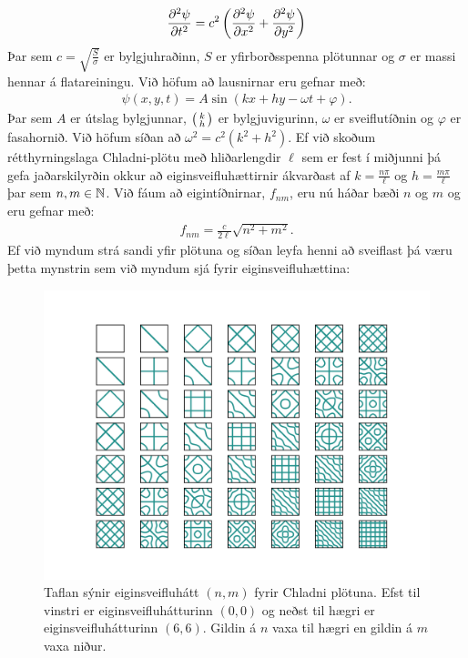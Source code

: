 \begin{align*}
    \pdv[2]{\psi}{t} = c^2\left( \pdv[2]{\psi}{x} + \pdv[2]{\psi}{y} \right)
\end{align*}
Þar sem $c = \sqrt{\frac{S}{\sigma}}$ er bylgjuhraðinn, $S$ er yfirborðsspenna plötunnar og $\sigma$ er massi hennar á flatareiningu. Við höfum að lausnirnar eru gefnar með:
\begin{align*}
    \psi(x,y,t) = A\sin( kx + hy - \omega t + \varphi).
\end{align*}
Þar sem $A$ er útslag bylgjunnar, $\smqty(k \\ h)$ er bylgjuvigurinn, $\omega$ er sveiflutíðnin og $\varphi$ er fasahornið. Við höfum síðan að $\omega^2 = c^2\left(k^2 + h^2 \right)$. Ef við skoðum rétthyrningslaga Chladni-plötu með hliðarlengdir $\ell$ sem er fest í miðjunni þá gefa jaðarskilyrðin okkur að eiginsveifluhættirnir ákvarðast af $k = \frac{n\pi}{\ell}$ og $h = \frac{m\pi}{\ell}$ þar sem $n,m \in \mathbb{N}$. Við fáum að eigintíðnirnar, $f_{nm}$, eru nú háðar bæði $n$ og $m$ og eru gefnar með:
\begin{align*}
    f_{nm} = \frac{c}{2\ell} \sqrt{n^2 + m^2}. 
\end{align*}
Ef við myndum strá sandi yfir plötuna og síðan leyfa henni að sveiflast þá væru þetta mynstrin sem við myndum sjá fyrir eiginsveifluhættina:

\begin{figure}[H]
    \centering
    \includegraphics[width = \textwidth]{figures/chlad.png}
    \caption{Taflan sýnir eiginsveifluhátt $(n,m)$ fyrir Chladni plötuna. Efst til vinstri er eiginsveifluhátturinn  $(0,0)$ og neðst til hægri er eiginsveifluhátturinn $(6,6)$. Gildin á $n$ vaxa til hægri en gildin á $m$ vaxa niður.}
    \label{fig:chlad}
\end{figure}

